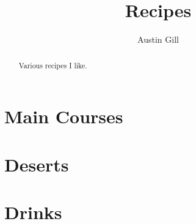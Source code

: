 \documentclass{article}
\title{Recipes}
\author{Austin Gill}
\begin{document}
    \maketitle
    \begin{abstract}
        Various recipes I like.
    \end{abstract}
    \thispagestyle{empty}

    \newpage
    \tableofcontents

    \newpage
    \section{Main Courses}\label{sec:main-courses}
        

    \newpage
    \section{Deserts}\label{sec:deserts}
        

    \newpage
    \section{Drinks}\label{sec:drinks}
        
\end{document}
